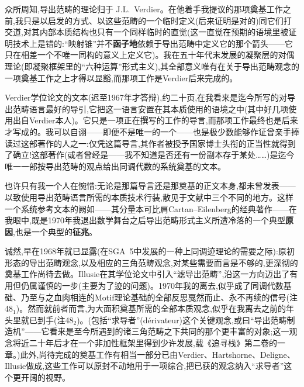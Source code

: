 
众所周知,导出范畴的理论归于 J.L.~Verdier。在他着手我提议的那项奠基工作之前,我只是以启发的方式、以这些范畴的一个临时定义(后来证明是对的)同它们打交道,对其内部本质结构也只有一个同样临时的直觉(这一直觉在预期的语境里被证明技术上是错的:“映射锥”并不\textbf{函子地}依赖于导出范畴中定义它的那个箭头——它只在相差一个不唯一同构的意义上定义它)。我在五十年代末发展的凝聚层的对偶理论(即凝聚框架里的“六种运算”形式主义),其全部意义唯有在关于导出范畴观念的一项奠基工作之上才得以显豁,而那项工作是Verdier后来完成的。

Verdier学位论文的文本(迟至1967年才答辩),约二十页,在我看来是迄今所写的对导出范畴语言最好的导引,它把这一语言安置在其本质使用的语境之中(其中好几项使用出自Verdier本人)。它只是一项正在撰写的工作的导言,而那项工作最终也是后来才写成的。我可以自诩——即便不是唯一的一个——也是极少数能够作证曾亲手捧读过这部著作的人之一:仅凭这篇导言,其作者被授予国家博士头衔的正当性就得到了确立!这部著作(或者曾经是——我不知道是否还有一份副本存于某处……)是迄今唯一一部按导出范畴的观点给出同调代数的系统奠基的文本。

\pmark 也许只有我一个人在惋惜:无论是那篇导言还是那奠基的正文本身,都未曾发表——以致使用导出范畴语言所需的本质技术行装,散见于文献中三个不同的地方。这样一个系统参考文本的阙如——其分量本可比肩Cartan--Eilenberg的经典著作——在我眼中,既是1970年我退出数学舞台之后导出范畴形式主义所遭冷落的一个典型\textbf{原因},也是一个典型的\textbf{征兆}。

诚然,早在1968年就已显露(在SGA~5中发展的一种上同调迹理论的需要之际):原初形态的导出范畴观念,以及相应的三角范畴观念,对某些需要而言是不够的,更深彻的奠基工作尚待去做。Illusie在其学位论文中引入“滤导出范畴”,沿这一方向迈出了有用但仍属谨慎的一步(主要为了迹的问题)。1970年我的离去,似乎成了同调代数基础、乃至与之血肉相连的Motif理论基础的全部反思戛然而止、永不再续的信号(注48$_{1}$)。然而就前者而言,为大面积奠基所需的全部本质观念,似乎在我离去之前的年头里就已到手(注48$_{2}$)。(包括“求导者”(dérivateur)这个关键观念,或曰“导出范畴制造机”——它看来是至今所遇到的诸三角范畴之下共同的那个更丰富的对象;这一观念将近二十年后才在一个非加性框架里得到少许发展,载《追寻栈》第二卷的一章。)此外,尚待完成的奠基工作有相当一部分已由Verdier、Hartshorne、Deligne、Illusie做成,这些工作可以原封不动地用于一项综合,把已获的观念纳入“求导者”这个更开阔的视野。

